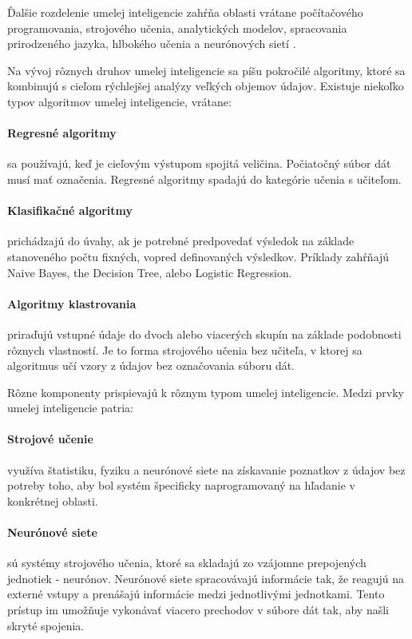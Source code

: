 Ďalšie rozdelenie umelej inteligencie zahŕňa oblasti vrátane počítačového programovania, strojového učenia, analytických modelov, spracovania prirodzeného jazyka, hlbokého učenia a neurónových sietí \cite{ai2}.

Na vývoj rôznych druhov umelej inteligencie sa píšu pokročilé algoritmy, ktoré sa kombinujú s cieľom rýchlejšej analýzy veľkých objemov údajov. Existuje niekoľko typov algoritmov umelej inteligencie, vrátane:
\paragraph{Regresné algoritmy} sa používajú, keď je cieľovým výstupom spojitá veličina. Počiatočný súbor dát musí mať označenia. Regresné algoritmy spadajú do kategórie učenia s učiteľom.

\paragraph{Klasifikačné algoritmy} prichádzajú do úvahy, ak je potrebné predpovedať výsledok na základe stanoveného počtu fixných, vopred definovaných výsledkov. Príklady zahŕňajú Naive Bayes, the Decision Tree, alebo Logistic Regression.

\paragraph{Algoritmy klastrovania} priraďujú vstupné údaje do dvoch alebo viacerých skupín na základe podobnosti rôznych vlastností. Je to forma strojového učenia bez učiteľa, v ktorej sa algoritmus učí vzory z údajov bez označovania súboru dát.

Rôzne komponenty prispievajú k rôznym typom umelej inteligencie. Medzi prvky umelej inteligencie patria:
\paragraph{Strojové učenie} využíva štatistiku, fyziku a neurónové siete na získavanie poznatkov z údajov bez potreby toho, aby bol systém špecificky naprogramovaný na hľadanie v konkrétnej oblasti.

\paragraph{Neurónové siete} sú systémy strojového učenia, ktoré sa skladajú zo vzájomne prepojených jednotiek - neurónov. Neurónové siete spracovávajú informácie tak, že reagujú na externé vstupy a prenášajú informácie medzi jednotlivými jednotkami. Tento prístup im umožňuje vykonávať viacero prechodov v súbore dát tak, aby našli skryté spojenia.

